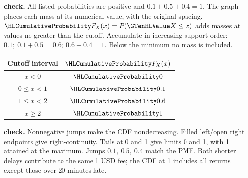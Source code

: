 \textbf{ check.} All listed probabilities are positive and $0.1+0.5+0.4=1$. The graph places each mass at its numerical value, with the original spacing.
$\cTwoCDFHL{F_X(x)}=P(\cTwoValue{X}\leq x)$ adds masses at values no greater than the cutoff. Accumulate in increasing support order: $0.1;\ 0.1+0.5=0.6;\ 0.6+0.4=1$. Below the minimum no mass is included.
\par\noindent\begin{minipage}[t]{.38\linewidth}\vspace{0pt}\centering\begin{tabular}{cc}\toprule Cutoff interval & $\cTwoCDFHL{F_X(x)}$ \\\midrule
$x<0$ & $\cTwoCDFHL{0}$ \\
$0\leq x<1$ & $\cTwoCDFHL{0.1}$ \\
$1\leq x<2$ & $\cTwoCDFHL{0.6}$ \\
$x\geq 2$ & $\cTwoCDFHL{1}$ \\
\bottomrule\end{tabular}\end{minipage}\hfill\begin{minipage}[t]{.59\linewidth}\vspace{0pt}\centering{}\end{minipage}\par
\textbf{ check.} Nonnegative jumps make the CDF nondecreasing. Filled left/open right endpoints give right-continuity. Tails at 0 and 1 give limits 0 and 1, with 1 attained at the maximum. Jumps $0.1,\ 0.5,\ 0.4$ match the PMF. Both shorter delays contribute to the same 1 USD fee; the CDF at 1 includes all returns except those over 20 minutes late.
\clearpage
